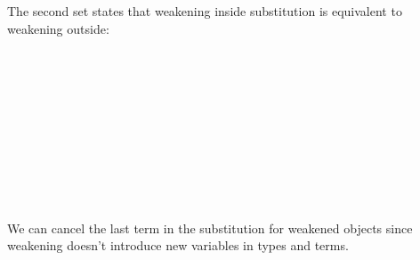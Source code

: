 The second set states that weakening inside substitution is equivalent to weakening outside:

\begin{code}\>\<%
\\
\> \<[8]%
\>[8]\AgdaSymbol{:}    \AgdaSymbol{\}\{} \AgdaSymbol{:}   \AgdaSymbol{\}}\<%
\\
\>[0]\<[8]%
\>[8]  \AgdaFunction{[}    \AgdaFunction{]T}  \AgdaSymbol{(} \AgdaFunction{[}  \AgdaFunction{]T}\AgdaSymbol{)}   \<[42]%
\>[42]\<%
\\
%
\\
\> \<[8]%
\>[8]\AgdaSymbol{:}    \AgdaSymbol{\}(} \AgdaSymbol{:}  \AgdaSymbol{)\{} \AgdaSymbol{:}   \AgdaSymbol{\}}\<%
\\
\>[0]\<[8]%
\>[8]  \AgdaFunction{[}    \AgdaFunction{]tm}  \AgdaSymbol{(} \AgdaFunction{[}  \AgdaFunction{]tm}\AgdaSymbol{)}  \<%
\\
%
\\
\> \<[8]%
\>[8]\AgdaSymbol{:}    \AgdaSymbol{\}\{} \AgdaSymbol{:}   \AgdaSymbol{\}\{} \AgdaSymbol{:}   \AgdaSymbol{\}}\<%
\\
\>[0]\<[8]%
\>[8]   \AgdaSymbol{(}  \AgdaSymbol{)}  \AgdaSymbol{(}  \AgdaSymbol{)}  \<%
\\
\>\<\end{code}
We can cancel the last term in the substitution for weakened objects
since weakening doesn't introduce new variables in types and terms.

